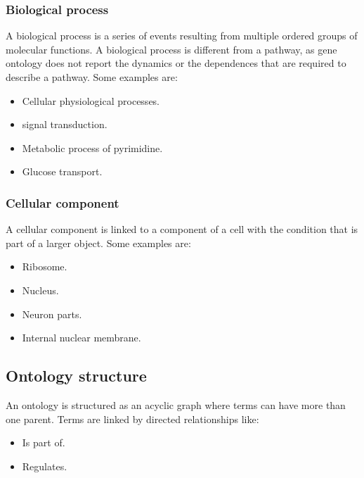 		\subsubsection{Biological process}
		A biological process is a series of events resulting from multiple ordered groups of molecular functions.
		A biological process is different from a pathway, as gene ontology does not report the dynamics or the dependences that are required to describe a pathway.
		Some examples are:

		\begin{multicols}{4}
			\begin{itemize}
				\item Cellular physiological processes.
				\item signal transduction.
				\item Metabolic process of pyrimidine.
				\item Glucose transport.
			\end{itemize}
		\end{multicols}

		\subsubsection{Cellular component}
		A cellular component is linked to a component of a cell with the condition that is part of a larger object.
		Some examples are:

		\begin{multicols}{4}
			\begin{itemize}
				\item Ribosome.
				\item Nucleus.
				\item Neuron parts.
				\item Internal nuclear membrane.
			\end{itemize}
		\end{multicols}

	\subsection{Ontology structure}
	An ontology is structured as an acyclic graph where terms can have more than one parent.
	Terms are linked by directed relationships like:

	\begin{multicols}{2}
		\begin{itemize}
			\item Is part of.
			\item Regulates.
		\end{itemize}
	\end{multicols}

